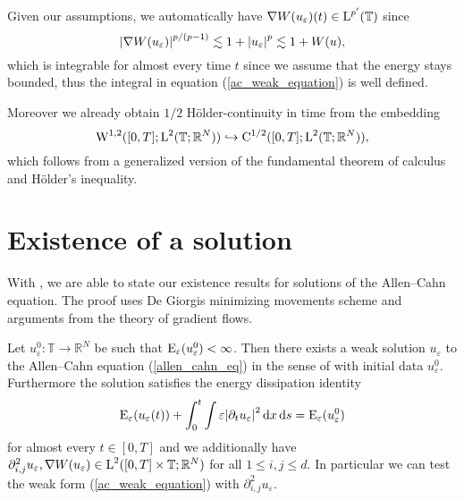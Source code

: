 \begin{remark}
	Given our assumptions, we automatically have $ \nabla W ( u_{ \varepsilon } ) ( t ) \in \operatorname{L}^{ p' } ( \mathbb{ T } ) $ since
	\begin{equation}
		\abs{ \nabla W ( u_{ \varepsilon} ) }^{ p/(p-1) }
		\lesssim
		1+ \abs{u_{ \varepsilon }}^{ p }
		\lesssim
		1 + W ( u ),
	\end{equation}
	which is integrable for almost every time $ t $ since we assume that the energy stays bounded,
	thus the integral in equation (\ref{ac_weak_equation}) is well defined.
	
	Moreover we already obtain $ 1/2 $ Hölder-continuity in time from the embedding
	\begin{equation}
		\operatorname{W}^{ 1 , 2} ( [ 0 , T ] ; \operatorname{L}^{ 2 } ( \mathbb{ T };\mathbb{ R }^{ N } ) )
		\hookrightarrow
		\operatorname{C}^{ 1/2 } ( [ 0 , T ] ; \operatorname{L}^{ 2 } ( \mathbb{ T } ; \mathbb{ R }^{ N } ) ),
	\end{equation}
	which follows from a generalized version of the fundamental theorem of calculus and Hölder's inequality.
\end{remark}

\section{Existence of a solution}

With , we are able to state our existence results for solutions of the Allen--Cahn equation. The proof uses De Giorgis minimizing movements scheme and arguments from the theory of gradient flows.

\begin{theorem}
	\label{existence_of_ac_solution}
	Let $ u_{ \varepsilon}^{ 0 } \colon \mathbb{ T } \to \mathbb{ R }^{ N } $ be such that 
	$ \operatorname{E}_{ \varepsilon } ( u_{ \varepsilon}^{ 0 } ) < \infty $.
	Then there exists a weak solution $ u_{ \varepsilon} $ to the Allen--Cahn equation (\ref{allen_cahn_eq}) in the sense of  with initial data $ u_{ \varepsilon}^{ 0 } $.
	Furthermore the solution satisfies the energy dissipation identity
	\begin{equation}
		\operatorname{E}_{ \varepsilon } ( u_{ \varepsilon } ( t ) )
		+
		\int_{ 0 }^{ t }
			\int
				\varepsilon \abs{ \partial_{ t } u_{ \varepsilon } }^{ 2 }
			\dd{ x }
		\dd{ s }
		=
		\operatorname{E}_{ \varepsilon } ( u_{ \varepsilon}^{ 0 } )
	\end{equation}
	for almost every $ t \in [ 0 , T ] $ and we additionally have
	$
		\partial_{ i , j }^{ 2 } u_{ \varepsilon }, \nabla W ( u_{ \varepsilon } ) \in \operatorname{L}^{ 2 } ( [0, T] \times \mathbb{ T } ; \mathbb{ R }^{ N } ) 
	$
	for all $ 1 \leq i, j \leq d $. In particular we can test the weak form (\ref{ac_weak_equation}) with $ \partial_{ i , j }^{ 2 } u_{ \varepsilon } $.
\end{theorem}

